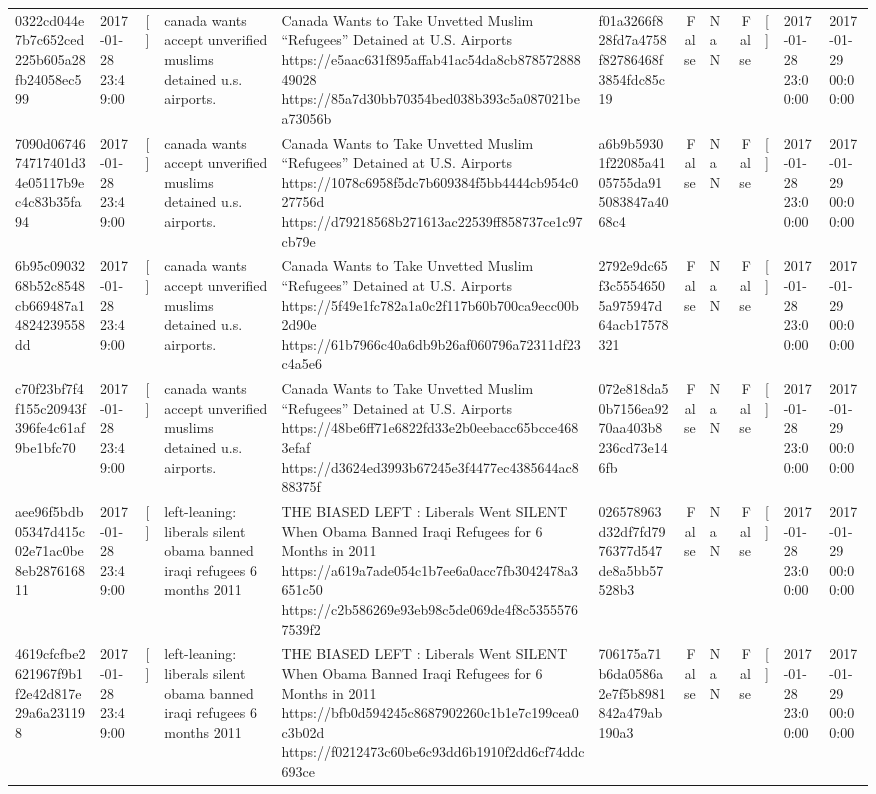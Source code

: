 \begin{tabular}{llllllrlrlll}
0322cd044e7b7c652ced225b605a28fb24058ec599 & 2017-01-28 23:49:00 & [] & canada wants accept unverified muslims detained u.s. airports. & Canada Wants to Take Unvetted Muslim “Refugees” Detained at U.S. Airports https://e5aac631f895affab41ac54da8cb87857288849028 https://85a7d30bb70354bed038b393c5a087021bea73056b & f01a3266f828fd7a4758f82786468f3854fdc85c19 & False & NaN & False & [] & 2017-01-28 23:00:00 & 2017-01-29 00:00:00 \\
7090d0674674717401d34e05117b9ec4c83b35fa94 & 2017-01-28 23:49:00 & [] & canada wants accept unverified muslims detained u.s. airports. & Canada Wants to Take Unvetted Muslim “Refugees” Detained at U.S. Airports https://1078c6958f5dc7b609384f5bb4444cb954c027756d https://d79218568b271613ac22539ff858737ce1c97cb79e & a6b9b59301f22085a4105755da915083847a4068c4 & False & NaN & False & [] & 2017-01-28 23:00:00 & 2017-01-29 00:00:00 \\
6b95c0903268b52c8548cb669487a14824239558dd & 2017-01-28 23:49:00 & [] & canada wants accept unverified muslims detained u.s. airports. & Canada Wants to Take Unvetted Muslim “Refugees” Detained at U.S. Airports https://5f49e1fc782a1a0c2f117b60b700ca9ecc00b2d90e https://61b7966c40a6db9b26af060796a72311df23c4a5e6 & 2792e9dc65f3c55546505a975947d64acb17578321 & False & NaN & False & [] & 2017-01-28 23:00:00 & 2017-01-29 00:00:00 \\
c70f23bf7f4f155c20943f396fe4c61af9be1bfc70 & 2017-01-28 23:49:00 & [] & canada wants accept unverified muslims detained u.s. airports. & Canada Wants to Take Unvetted Muslim “Refugees” Detained at U.S. Airports https://48be6ff71e6822fd33e2b0eebacc65bcce4683efaf https://d3624ed3993b67245e3f4477ec4385644ac888375f & 072e818da50b7156ea9270aa403b8236cd73e146fb & False & NaN & False & [] & 2017-01-28 23:00:00 & 2017-01-29 00:00:00 \\
aee96f5bdb05347d415c02e71ac0be8eb287616811 & 2017-01-28 23:49:00 & [] & left-leaning: liberals silent obama banned iraqi refugees 6 months 2011 & THE BIASED LEFT : Liberals Went SILENT When Obama Banned Iraqi Refugees for 6 Months in 2011 https://a619a7ade054c1b7ee6a0acc7fb3042478a3651c50 https://c2b586269e93eb98c5de069de4f8c53555767539f2 & 026578963d32df7fd7976377d547de8a5bb57528b3 & False & NaN & False & [] & 2017-01-28 23:00:00 & 2017-01-29 00:00:00 \\
4619cfcfbe2621967f9b1f2e42d817e29a6a231198 & 2017-01-28 23:49:00 & [] & left-leaning: liberals silent obama banned iraqi refugees 6 months 2011 & THE BIASED LEFT : Liberals Went SILENT When Obama Banned Iraqi Refugees for 6 Months in 2011 https://bfb0d594245c8687902260c1b1e7c199cea0c3b02d https://f0212473c60be6c93dd6b1910f2dd6cf74ddc693ce & 706175a71b6da0586a2e7f5b8981842a479ab190a3 & False & NaN & False & [] & 2017-01-28 23:00:00 & 2017-01-29 00:00:00 \\

\end{tabular}
